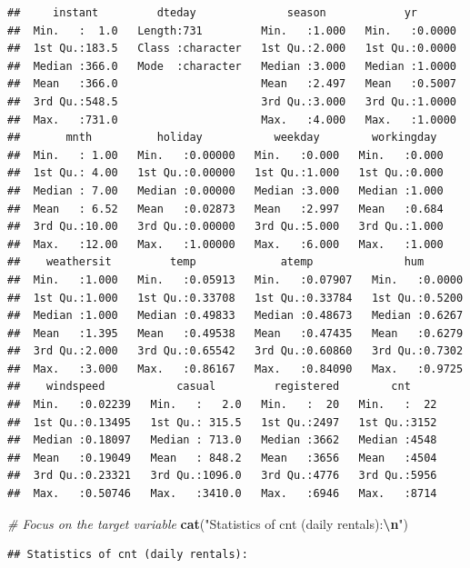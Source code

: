 \documentclass[
]{article}
\newenvironment{Shaded}{\begin{snugshade}}{\end{snugshade}}
\newcommand{\CommentTok}[1]{\textcolor[rgb]{0.56,0.35,0.01}{\textit{#1}}}
\newcommand{\FunctionTok}[1]{\textcolor[rgb]{0.13,0.29,0.53}{\textbf{#1}}}
\newcommand{\NormalTok}[1]{#1}
\newcommand{\SpecialCharTok}[1]{\textcolor[rgb]{0.81,0.36,0.00}{\textbf{#1}}}
\newcommand{\StringTok}[1]{\textcolor[rgb]{0.31,0.60,0.02}{#1}}
\begin{document}
\begin{verbatim}
##     instant         dteday              season            yr        
##  Min.   :  1.0   Length:731         Min.   :1.000   Min.   :0.0000  
##  1st Qu.:183.5   Class :character   1st Qu.:2.000   1st Qu.:0.0000  
##  Median :366.0   Mode  :character   Median :3.000   Median :1.0000  
##  Mean   :366.0                      Mean   :2.497   Mean   :0.5007  
##  3rd Qu.:548.5                      3rd Qu.:3.000   3rd Qu.:1.0000  
##  Max.   :731.0                      Max.   :4.000   Max.   :1.0000  
##       mnth          holiday           weekday        workingday   
##  Min.   : 1.00   Min.   :0.00000   Min.   :0.000   Min.   :0.000  
##  1st Qu.: 4.00   1st Qu.:0.00000   1st Qu.:1.000   1st Qu.:0.000  
##  Median : 7.00   Median :0.00000   Median :3.000   Median :1.000  
##  Mean   : 6.52   Mean   :0.02873   Mean   :2.997   Mean   :0.684  
##  3rd Qu.:10.00   3rd Qu.:0.00000   3rd Qu.:5.000   3rd Qu.:1.000  
##  Max.   :12.00   Max.   :1.00000   Max.   :6.000   Max.   :1.000  
##    weathersit         temp             atemp              hum        
##  Min.   :1.000   Min.   :0.05913   Min.   :0.07907   Min.   :0.0000  
##  1st Qu.:1.000   1st Qu.:0.33708   1st Qu.:0.33784   1st Qu.:0.5200  
##  Median :1.000   Median :0.49833   Median :0.48673   Median :0.6267  
##  Mean   :1.395   Mean   :0.49538   Mean   :0.47435   Mean   :0.6279  
##  3rd Qu.:2.000   3rd Qu.:0.65542   3rd Qu.:0.60860   3rd Qu.:0.7302  
##  Max.   :3.000   Max.   :0.86167   Max.   :0.84090   Max.   :0.9725  
##    windspeed           casual         registered        cnt      
##  Min.   :0.02239   Min.   :   2.0   Min.   :  20   Min.   :  22  
##  1st Qu.:0.13495   1st Qu.: 315.5   1st Qu.:2497   1st Qu.:3152  
##  Median :0.18097   Median : 713.0   Median :3662   Median :4548  
##  Mean   :0.19049   Mean   : 848.2   Mean   :3656   Mean   :4504  
##  3rd Qu.:0.23321   3rd Qu.:1096.0   3rd Qu.:4776   3rd Qu.:5956  
##  Max.   :0.50746   Max.   :3410.0   Max.   :6946   Max.   :8714
\end{verbatim}

\begin{Shaded}
\begin{Highlighting}[]
\CommentTok{\# Focus on the target variable}
\FunctionTok{cat}\NormalTok{(}\StringTok{"Statistics of cnt (daily rentals):}\SpecialCharTok{\textbackslash{}n}\StringTok{"}\NormalTok{)}
\end{Highlighting}
\end{Shaded}

\begin{verbatim}
## Statistics of cnt (daily rentals):
\end{verbatim}
\end{document}
